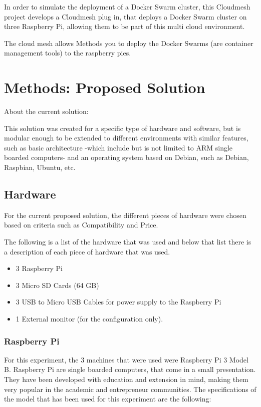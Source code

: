 \documentclass[sigconf]{acmart}
\begin{document}
	In order to simulate the deployment of a Docker Swarm cluster, this Cloudmesh project develops a Cloudmesh plug in, that deploys a Docker Swarm cluster on three Raspberry Pi, allowing them to be part of this multi cloud environment.
	
	The cloud mesh allows Methods you to deploy the Docker Swarms (are container management tools) to the raspberry pies.     
	
	\section{Methods: Proposed Solution}
	
	About the current solution:
	
	This solution was created for a specific type of hardware and software, but is modular enough to be extended to different environments with similar features, such as basic architecture -which include but is not limited to ARM single boarded computers- and an operating system based on Debian, such as Debian, Raspbian, Ubuntu, etc.
	
	\subsection{Hardware}
	
	For the current proposed solution, the different pieces of hardware were chosen based on criteria such as Compatibility and Price.
	
	The following is a list of the hardware that was used  and below that list there is a description of each piece of hardware that was used.
	
	\begin{itemize}
	\item 3 Raspberry Pi
	\item 3 Micro SD Cards (64 GB)
	\item 3 USB to Micro USB Cables for power supply to the Raspberry Pi
	\item 1 External monitor (for the configuration only).
	\end{itemize}
	

	\subsubsection{Raspberry Pi}
	
	For this experiment, the 3 machines that were used were Raspberry Pi 3 Model B.
	Raspberry Pi are single boarded computers, that come in a small presentation. They have been developed with education and extension in mind, making them very popular in the academic and entrepreneur communities. The specifications of the model that has been used for this experiment are the following:
	
\end{document}
